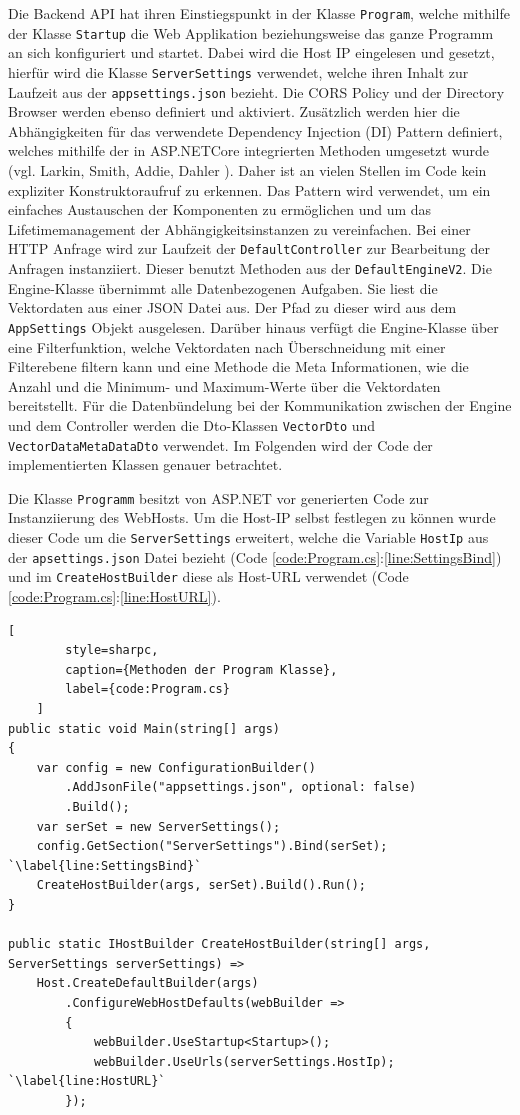 Die Backend API hat ihren Einstiegspunkt in der Klasse \texttt{Program}, welche mithilfe der Klasse \texttt{Startup} die Web Applikation beziehungsweise das ganze Programm an sich konfiguriert und startet. Dabei wird die Host IP eingelesen und gesetzt, hierfür wird die Klasse \texttt{ServerSettings} verwendet, welche ihren Inhalt zur Laufzeit aus der \texttt{appsettings.json} bezieht. Die CORS Policy und der Directory Browser werden ebenso definiert und aktiviert. Zusätzlich werden hier die Abhängigkeiten für das verwendete Dependency Injection (DI) Pattern definiert, welches mithilfe der in ASP.NETCore integrierten Methoden umgesetzt wurde (vgl. Larkin, Smith, Addie, Dahler \cite{Dependen80:online}). Daher ist an vielen Stellen im Code kein expliziter Konstruktoraufruf zu erkennen. Das Pattern wird verwendet, um ein einfaches Austauschen der Komponenten zu ermöglichen und um das Lifetimemanagement der Abhängigkeitsinstanzen zu vereinfachen. Bei einer HTTP Anfrage wird zur Laufzeit der \texttt{DefaultController} zur Bearbeitung der Anfragen instanziiert. Dieser benutzt Methoden aus der \texttt{DefaultEngineV2}. Die Engine-Klasse übernimmt alle Datenbezogenen Aufgaben. Sie liest die Vektordaten aus einer JSON Datei aus. Der Pfad zu dieser wird aus dem \texttt{AppSettings} Objekt ausgelesen. Darüber hinaus verfügt die Engine-Klasse über eine Filterfunktion, welche Vektordaten nach Überschneidung mit einer Filterebene filtern kann und eine Methode die Meta Informationen, wie die Anzahl und die Minimum- und Maximum-Werte über die Vektordaten bereitstellt. Für die Datenbündelung bei der Kommunikation zwischen der Engine und dem Controller werden die Dto-Klassen \texttt{VectorDto} und \texttt{VectorDataMetaDataDto} verwendet. Im Folgenden wird der Code der implementierten Klassen genauer betrachtet.

Die Klasse \texttt{Programm} besitzt von ASP.NET vor generierten Code zur Instanziierung
des WebHosts. Um die Host-IP selbst festlegen zu können wurde dieser
Code um die \texttt{ServerSettings} erweitert, welche die Variable \texttt{HostIp} aus der
\texttt{apsettings.json} Datei bezieht
(Code \ref{code:Program.cs}:\ref{line:SettingsBind}) und im
\texttt{CreateHostBuilder} diese als Host-URL verwendet
(Code \ref{code:Program.cs}:\ref{line:HostURL}).

\begin{codeblock}
	\begin{lstlisting}[
		style=sharpc,
		caption={Methoden der Program Klasse},
		label={code:Program.cs}
	]
public static void Main(string[] args)
{
	var config = new ConfigurationBuilder()
		.AddJsonFile("appsettings.json", optional: false)
		.Build();
	var serSet = new ServerSettings();
	config.GetSection("ServerSettings").Bind(serSet); `\label{line:SettingsBind}`
	CreateHostBuilder(args, serSet).Build().Run();
}

public static IHostBuilder CreateHostBuilder(string[] args, ServerSettings serverSettings) =>
	Host.CreateDefaultBuilder(args)
		.ConfigureWebHostDefaults(webBuilder =>
		{
			webBuilder.UseStartup<Startup>();
			webBuilder.UseUrls(serverSettings.HostIp); `\label{line:HostURL}`
		});
	\end{lstlisting}
\end{codeblock}

